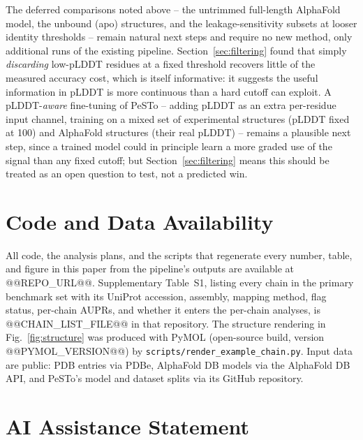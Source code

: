 \documentclass[10pt]{article}
\begin{document}
The deferred comparisons noted above -- the untrimmed full-length AlphaFold
model, the unbound (apo) structures, and the leakage-sensitivity subsets at
looser identity thresholds -- remain natural next steps and require no new
method, only additional runs of the existing pipeline.
Section~\ref{sec:filtering} found that simply \emph{discarding} low-pLDDT
residues at a fixed threshold recovers little of the measured accuracy cost,
which is itself informative: it suggests the useful information in pLDDT is
more continuous than a hard cutoff can exploit. A pLDDT-\emph{aware}
fine-tuning of PeSTo -- adding pLDDT as an extra per-residue input channel,
training on a mixed set of experimental structures (pLDDT fixed at 100) and
AlphaFold structures (their real pLDDT) -- remains a plausible next step,
since a trained model could in principle learn a more graded use of the
signal than any fixed cutoff; but Section~\ref{sec:filtering} means this
should be treated as an open question to test, not a predicted win.

\section*{Code and Data Availability}

All code, the analysis plans, and the scripts that regenerate every number,
table, and figure in this paper from the pipeline's outputs are available at
@@REPO_URL@@. Supplementary Table~S1, listing every chain in the primary
benchmark set with its UniProt accession, assembly, mapping method, flag
status, per-chain AUPRs, and whether it enters the per-chain analyses, is
@@CHAIN_LIST_FILE@@ in that repository. The structure rendering in
Fig.~\ref{fig:structure} was produced with PyMOL (open-source build, version
@@PYMOL_VERSION@@) \cite{pymol} by \texttt{scripts/render\_example\_chain.py}.
Input data are public: PDB entries via PDBe, AlphaFold DB models via the
AlphaFold DB API, and PeSTo's model and dataset splits via its GitHub
repository.

\section*{AI Assistance Statement}
\end{document}
